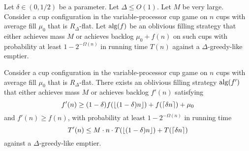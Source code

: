 \begin{lemma}
  \label{lem:obliviousAmplification} 
  Let $\delta \in (0, 1/2)$ be a parameter. Let $\Delta \le
  O(1)$. Let $M$ be very large. Consider a cup configuration in
  the variable-processor cup game on $n$ cups with average fill
  $\mu_0$ that is $R_\Delta$-flat. Let $\operatorname{\text{\textup{alg}}}(f)$ be an oblivious
  filling strategy that either achieves mass $M$ or achieves
  backlog $\mu_0 + f(n)$ on such cups with probability at least
  $1-2^{-\Omega(n)}$ in running time $T(n)$ against a
  $\Delta$-greedy-like emptier.

  Consider a cup configuration in the variable-processor cup game
  on $n$ cups with average fill $\mu_0$ that is $R_\Delta$-flat.
  There exists an oblivious filling strategy $\operatorname{\text{\textup{alg}}}(f')$ that
  either achieves mass $M$ or achieves backlog $f'(n)$ satisfying
  $$f'(n) \ge (1-\delta) f(\left\lfloor (1-\delta)n \right\rfloor) + f(\left\lceil \delta n \right\rceil) + \mu_0$$
  and $f'(n) \ge f(n)$, with probability at least
  $1-2^{-\Omega(n)}$ in running time 
  $$T'(n) \le M\cdot n\cdot T(\left\lfloor (1-\delta)n \right\rfloor) + T(\left\lceil \delta n \right\rceil)$$ 
  against a $\Delta$-greedy-like emptier.
\end{lemma}

